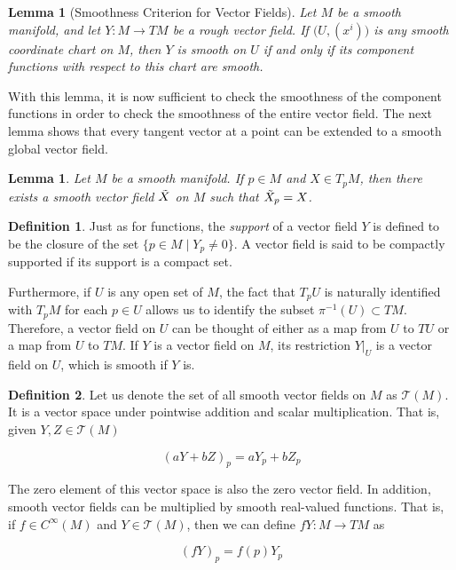 \documentclass{article}
\newtheorem{lemma}[theorem]{Lemma}
\theoremstyle{remark}
\theoremstyle{definition}
\newtheorem{definition}{Definition}[section]
\begin{document}
    \begin{lemma}[Smoothness Criterion for Vector Fields]
      Let $M$ be a smooth manifold, and let $Y: M \longrightarrow TM$ be a rough vector field. If $\big( U, (x^i)\big)$ is any smooth coordinate chart on $M$, then $Y$ is smooth on $U$ if and only if its component functions with respect to this chart are smooth. 
    \end{lemma}

    With this lemma, it is now sufficient to check the smoothness of the component functions in order to check the smoothness of the entire vector field. The next lemma shows that every tangent vector at a point can be extended to a smooth global vector field. 

    \begin{lemma}
      Let $M$ be a smooth manifold. If $p \in M$ and $X \in T_p M$, then there exists a smooth vector field $\Tilde{X}$ on $M$ such that $\Tilde{X}_p = X$. 
    \end{lemma}

    \begin{definition}
      Just as for functions, the \textit{support} of a vector field $Y$ is defined to be the closure of the set $\{ p \in M\;|\; Y_p \neq 0\}$. A vector field is said to be compactly supported if its support is a compact set. 
    \end{definition}

    Furthermore, if $U$ is any open set of $M$, the fact that $T_p U$ is naturally identified with $T_p M$ for each $p \in U$ allows us to identify the subset $\pi^{-1} (U) \subset TM$. Therefore, a vector field on $U$ can be thought of either as a map from $U$ to $TU$ or a map from $U$ to $TM$. If $Y$ is a vector field on $M$, its restriction $Y |_U$ is a vector field on $U$, which is smooth if $Y$ is. 

    \begin{definition}
      Let us denote the set of all smooth vector fields on $M$ as $\mathcal{T}(M)$. It is a vector space under pointwise addition and scalar multiplication. That is, given $Y, Z \in \mathcal{T}(M)$

        \[(a Y + b Z)_p = a Y_p + b Z_p\]

      The zero element of this vector space is also the zero vector field. In addition, smooth vector fields can be multiplied by smooth real-valued functions. That is, if $f \in C^\infty (M)$ and $Y \in \mathcal{T}(M)$, then we can define $f Y: M \longrightarrow TM$ as 

        \[(fY)_p = f(p) Y_p\]
    \end{definition}
\end{document}

